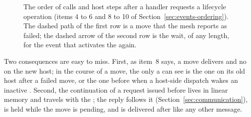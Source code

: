 \begin{figure}[htbp]
\caption{The order of calls and host steps after a handler requests a
lifecycle operation (items 4 to 6 and 8 to 10 of
Section~\ref{sec:events-ordering}). The dashed path of the first row is a
move that the mesh reports as failed; the dashed arrow of the second row is
the wait, of any length, for the event that activates the \paglet{} again.}
\label{fig:events-sequences}
\end{figure}

Two consequences are easy to miss. First, as item~8 says, a move delivers
 and no  on the new host; in the
course of a move, the only  a \paglet{} can see is the
one on its old host after a failed move, or the one before
 when a host-side dispatch wakes an inactive
\paglet{}. Second, the continuation of a request issued before
 lives in linear memory and travels with the \paglet{}; the
reply follows it (Section~\ref{sec:communication}), is held while the move
is pending, and is delivered after  like any other
message.
